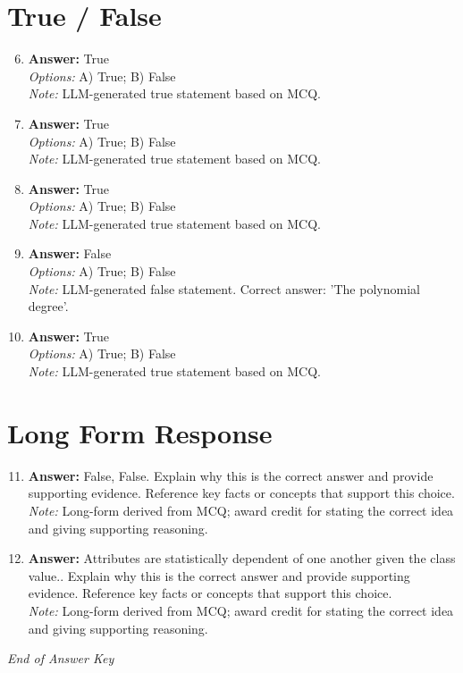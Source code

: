 \documentclass[12pt]{article}
\begin{document}
\section*{True / False}
\begin{enumerate}[label=\arabic*.]
\setcounter{enumi}{5}
\item \textbf{Answer:} True
\\ \textit{Options:} A) True; B) False
\\ \textit{Note:} LLM-generated true statement based on MCQ.
\item \textbf{Answer:} True
\\ \textit{Options:} A) True; B) False
\\ \textit{Note:} LLM-generated true statement based on MCQ.
\item \textbf{Answer:} True
\\ \textit{Options:} A) True; B) False
\\ \textit{Note:} LLM-generated true statement based on MCQ.
\item \textbf{Answer:} False
\\ \textit{Options:} A) True; B) False
\\ \textit{Note:} LLM-generated false statement. Correct answer: 'The polynomial degree'.
\item \textbf{Answer:} True
\\ \textit{Options:} A) True; B) False
\\ \textit{Note:} LLM-generated true statement based on MCQ.
\end{enumerate}

\section*{Long Form Response}
\begin{enumerate}[label=\arabic*.]
\setcounter{enumi}{10}
\item \textbf{Answer:} False, False. Explain why this is the correct answer and provide supporting evidence. Reference key facts or concepts that support this choice.
\\ \textit{Note:} Long-form derived from MCQ; award credit for stating the correct idea and giving supporting reasoning.
\item \textbf{Answer:} Attributes are statistically dependent of one another given the class value.. Explain why this is the correct answer and provide supporting evidence. Reference key facts or concepts that support this choice.
\\ \textit{Note:} Long-form derived from MCQ; award credit for stating the correct idea and giving supporting reasoning.
\end{enumerate}

\vfill
\noindent\textit{End of Answer Key}
\end{document}
